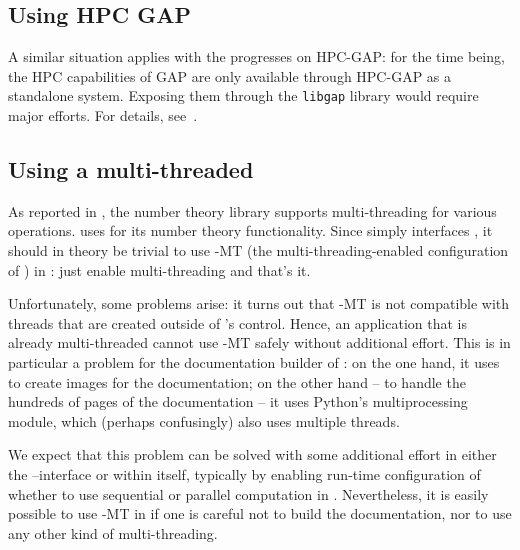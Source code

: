 \documentclass{deliverablereport}
\begin{document}
\subsection{Using HPC GAP}

A similar situation applies with the progresses on HPC-GAP: for the
time being, the HPC capabilities of GAP are only available through
HPC-GAP as a standalone system. Exposing them through the
\texttt{libgap} library would require major efforts. For details,
see~.

\subsection{Using a multi-threaded \Pari}

As reported in , the number theory library \Pari supports
multi-threading for various operations.
\Sage uses \Pari for its number theory functionality.
Since \Sage simply interfaces \Pari, it should in theory
be trivial to use \Pari-MT (the multi-threading-enabled configuration of \Pari) in \Sage:
just enable multi-threading and that's it.

Unfortunately, some problems arise:
it turns out that \Pari-MT is not compatible with
threads that are created outside of \Pari's control.
Hence, an application that is already multi-threaded cannot use
\Pari-MT safely without additional effort.
This is in particular a problem for the documentation builder of \Sage:
on the one hand, it uses \Pari to create images for the documentation;
on the other hand -- to handle the hundreds of pages of the documentation -- it uses Python's
multiprocessing module,
which (perhaps confusingly) also uses multiple threads.

We expect that this problem can be solved with some additional effort
in either the \Sage--\Pari interface or within \Pari itself,
typically by enabling run-time configuration of whether to use
sequential or parallel computation in \Pari.
Nevertheless, it is easily possible to use \Pari-MT in \Sage
if one is careful not to build the documentation,
nor to use any other kind of multi-threading.



\end{document}
